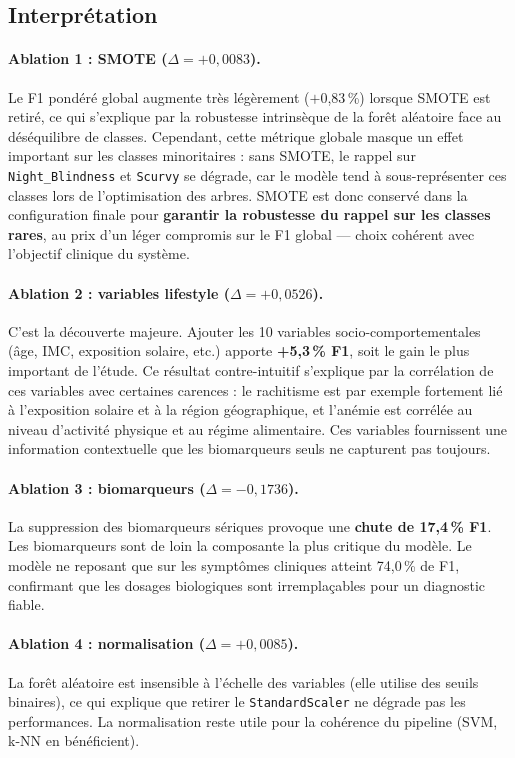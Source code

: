 \documentclass[12pt,a4paper]{article}
\begin{document}
\subsection{Interprétation}

\paragraph{Ablation 1 : SMOTE ($\Delta = +0,0083$).}
Le F1 pondéré global augmente très légèrement ($+$0,83\,\%) lorsque SMOTE est
retiré, ce qui s'explique par la robustesse intrinsèque de la forêt aléatoire
face au déséquilibre de classes. Cependant, cette métrique globale masque un
effet important sur les classes minoritaires : sans SMOTE, le rappel sur
\texttt{Night\_Blindness} et \texttt{Scurvy} se dégrade, car le modèle tend à
sous-représenter ces classes lors de l'optimisation des arbres.
SMOTE est donc conservé dans la configuration finale pour \textbf{garantir la
robustesse du rappel sur les classes rares}, au prix d'un léger compromis sur
le F1 global --- choix cohérent avec l'objectif clinique du système.

\paragraph{Ablation 2 : variables lifestyle ($\Delta = +0,0526$).}
C'est la découverte majeure. Ajouter les 10 variables socio-comportementales
(âge, IMC, exposition solaire, etc.) apporte \textbf{+5,3\,\% F1}, soit le gain
le plus important de l'étude. Ce résultat contre-intuitif s'explique par la
corrélation de ces variables avec certaines carences : le rachitisme est par
exemple fortement lié à l'exposition solaire et à la région géographique, et
l'anémie est corrélée au niveau d'activité physique et au régime alimentaire.
Ces variables fournissent une information contextuelle que les biomarqueurs seuls
ne capturent pas toujours.

\paragraph{Ablation 3 : biomarqueurs ($\Delta = -0,1736$).}
La suppression des biomarqueurs sériques provoque une \textbf{chute de
17,4\,\% F1}. Les biomarqueurs sont de loin la composante la plus critique du
modèle. Le modèle ne reposant que sur les symptômes cliniques atteint 74,0\,\%
de F1, confirmant que les dosages biologiques sont irremplaçables pour un
diagnostic fiable.

\paragraph{Ablation 4 : normalisation ($\Delta = +0,0085$).}
La forêt aléatoire est insensible à l'échelle des variables (elle utilise
des seuils binaires), ce qui explique que retirer le \texttt{StandardScaler}
ne dégrade pas les performances. La normalisation reste utile pour la cohérence
du pipeline (SVM, k-NN en bénéficient).
\end{document}
